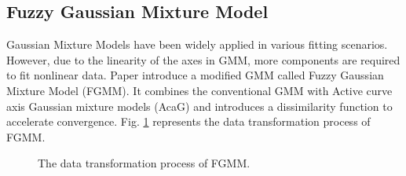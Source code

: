 \documentclass[conference]{IEEEtran}
\begin{document}
\subsection{Fuzzy Gaussian Mixture Model}
Gaussian Mixture Models have been widely applied in various fitting scenarios. However, due to the linearity of the axes in GMM, more components are required to fit nonlinear data. Paper \cite{Ju2012} introduce a modified GMM called Fuzzy Gaussian Mixture Model (FGMM). It combines the conventional GMM with Active curve axis Gaussian mixture models (AcaG)\cite{Zhang2005} and introduces a dissimilarity function to accelerate convergence. Fig. \ref{fig2} represents the data transformation process of FGMM.
\begin{figure}[!t]
    \centering
    \quad
    \caption{The data transformation process of FGMM.}
    \label{fig2}
\end{figure}
\end{document}
